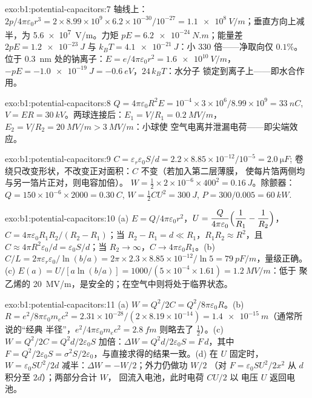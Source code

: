 \begin{solution}{exo:b1:potential-capacitors:7}
轴线上：$2p/4\pi\varepsilon_0r^3 = 2 \times 8.99 \times 10^9 \times 6.2 \times 10^{-30}/10^{-27} =
\qty{1.1e8}{V/m}$；垂直方向上减半，为 \qty{5.6e7}{V/m}。力矩 $pE =
\qty{6.2e-24}{N.m}$；能量差 $2pE = \qty{1.2e-23}{J}$ 与 $k_BT =
\qty{4.1e-21}{J}$：小 $330$ 倍——净取向仅 $0.1\%$。
位于 \qty{0.3}{nm} 处的钠离子：$E = e/4\pi\varepsilon_0r^2 = \qty{1.6e10}{V/m}$，$-pE
= \qty{-1.0e-19}{J} = \qty{-0.6}{eV}$，$24\,k_BT$：水分子
锁定到离子上——即水合作用。
\end{solution}

\begin{solution}{exo:b1:potential-capacitors:8}
$Q = 4\pi\varepsilon_0R^2E = 10^{-4} \times 3 \times 10^6/8.99 \times 10^9 = \qty{33}{nC}$,
$V = ER = \qty{30}{kV}$。两球连接后：$E_1 = V/R_1 = \qty{0.2}{MV/m}$，
$E_2 = V/R_2 = \qty{20}{MV/m} > \qty{3}{MV/m}$：小球使
空气电离并泄漏电荷——即尖端效应。
\end{solution}

\begin{solution}{exo:b1:potential-capacitors:9}
$C = \varepsilon_r\varepsilon_0S/d = 2.2 \times 8.85 \times 10^{-12}/10^{-5} = \qty{2.0}{\micro F}$;
卷绕只改变形状，不改变正对面积：$C$ 不变（若加入第二层薄膜，
使每片箔两侧均与另一箔片正对，则电容加倍）。
$W = \tfrac12 \times 2 \times 10^{-6} \times 400^2 = \qty{0.16}{J}$。除颤器：
$Q = 150 \times 10^{-6} \times 2000 = \qty{0.30}{C}$, $W = \tfrac12CU^2 = \qty{300}{J}$,
$P = 300/0.005 = \qty{60}{kW}$.
\end{solution}

\begin{solution}{exo:b1:potential-capacitors:10}
(a) $E = Q/4\pi\varepsilon_0r^2$，$U = \dfrac{Q}{4\pi\varepsilon_0}\Bigl(\dfrac1{R_1} -
\dfrac1{R_2}\Bigr)$，$C = 4\pi\varepsilon_0R_1R_2/(R_2 - R_1)$；当 $R_2 - R_1 = d \ll
R_1$，$R_1R_2 \approx R^2$，且 $C \approx 4\pi R^2\varepsilon_0/d = \varepsilon_0S/d$；当 $R_2 \to
\infty$，$C \to 4\pi\varepsilon_0R_1$。(b) $C/L = 2\pi\varepsilon_r\varepsilon_0/\ln(b/a) = 2\pi \times 2.3
\times 8.85 \times 10^{-12}/\ln5 = \qty{79}{pF/m}$，量级正确。(c) $E(a) =
U/[a\ln(b/a)] = 1000/(5 \times 10^{-4} \times 1.61) = \qty{1.2}{MV/m}$：低于
聚乙烯的 \qty{20}{MV/m}，是安全的；在空气中则将处于临界状态。
\end{solution}

\begin{solution}{exo:b1:potential-capacitors:11}
(a) $W = Q^2/2C = Q^2/8\pi\varepsilon_0R$。(b) $R = e^2/8\pi\varepsilon_0m_ec^2 = 2.31 \times
10^{-28}/(2 \times 8.19 \times 10^{-14}) = \qty{1.4e-15}{m}$（通常所说的“经典
半径”，$e^2/4\pi\varepsilon_0m_ec^2 = \qty{2.8}{fm}$ 则略去了 $\tfrac12$）。(c) $W =
Q^2/2C = Q^2d/2\varepsilon_0S$ 加倍：$\Delta W = Q^2d/2\varepsilon_0S = F\,d$，其中 $F =
Q^2/2\varepsilon_0S = \sigma^2S/2\varepsilon_0$，与直接求得的结果一致。(d) 在 $U$ 固定时，$W =
\varepsilon_0SU^2/2d$ 减半：$\Delta W = -W/2$；外力仍做功 $W/2$
（对 $F = \varepsilon_0SU^2/2x^2$ 从 $d$ 积分至 $2d$）；两部分合计 $W$，
回流入电池，此时电荷 $CU/2$ 以
电压 $U$ 返回电池。
\end{solution}

